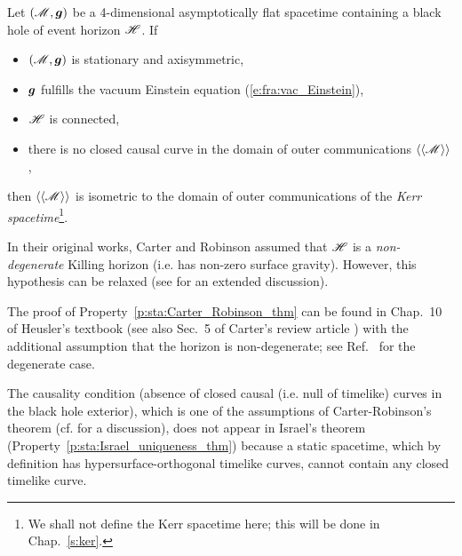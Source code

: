 \begin{prop}
\label{p:sta:Carter_Robinson_thm}
Let $(\mathscr{M},\bm{g})$ be a 4-dimensional asymptotically flat spacetime
containing a black hole of event horizon $\mathscr{H}$. If
\begin{itemize}
\item $(\mathscr{M},\bm{g})$ is stationary and axisymmetric,
\item $\bm{g}$ fulfills the vacuum Einstein equation (\ref{e:fra:vac_Einstein}),
\item $\mathscr{H}$ is connected,
\item there is no closed causal curve in the domain of outer communications $\langle\langle \mathscr{M}\rangle\rangle$,
\end{itemize}
then $\langle\langle \mathscr{M}\rangle\rangle$ is isometric
to the domain of outer communications of the
\emph{Kerr spacetime}\footnote{We shall not define the Kerr spacetime here; this will be done in Chap.~\ref{s:ker}.}.
\end{prop}

\begin{remark}
In their original works, Carter and Robinson assumed that $\mathscr{H}$ is a
\emph{non-degenerate}
Killing horizon (i.e. has non-zero surface gravity).
However, this hypothesis can be relaxed \cite{ChrusN10} (see \cite{ChrusLH12} for an
extended discussion).
\end{remark}

The proof of Property~\ref{p:sta:Carter_Robinson_thm}
can be found in Chap.~10 of Heusler's textbook \cite{Heusl96}
(see also Sec.~5 of Carter's review article \cite{Carte87}) with the additional
assumption that the horizon is non-degenerate; see
Ref.~\cite{ChrusN10} for the degenerate case.

\begin{remark}
The causality condition (absence of closed causal (i.e. null of timelike) curves in the black
hole exterior), which is one of the assumptions of Carter-Robinson's theorem
(cf. \cite{Carte99} for a discussion), does not appear in Israel's theorem
(Property~\ref{p:sta:Israel_uniqueness_thm}) because a static spacetime, which by definition
has hypersurface-orthogonal timelike curves,
cannot contain any closed timelike curve.
\end{remark}

